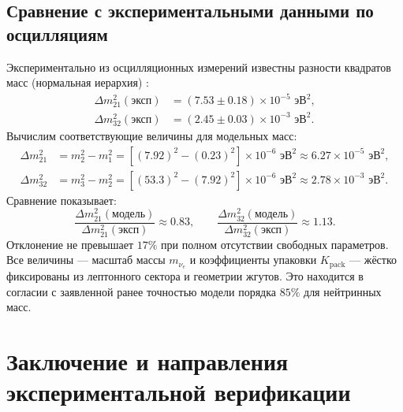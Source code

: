 \documentclass[12pt,a4paper]{article}
\begin{document}
\subsection{Сравнение с экспериментальными данными по осцилляциям}
Экспериментально из осцилляционных измерений известны разности квадратов масс (нормальная иерархия) \cite{pdg2024}:
\begin{align}
\Delta m^2_{21}(\text{эксп}) &= (7.53 \pm 0.18) \times 10^{-5} \text{ эВ}^2, \\
\Delta m^2_{32}(\text{эксп}) &= (2.45 \pm 0.03) \times 10^{-3} \text{ эВ}^2.
\end{align}
Вычислим соответствующие величины для модельных масс:
\begin{align}
\Delta m^2_{21} &= m_2^2 - m_1^2 = [(7.92)^2 - (0.23)^2] \times 10^{-6} \text{ эВ}^2 \approx 6.27 \times 10^{-5} \text{ эВ}^2, \\
\Delta m^2_{32} &= m_3^2 - m_2^2 = [(53.3)^2 - (7.92)^2] \times 10^{-6} \text{ эВ}^2 \approx 2.78 \times 10^{-3} \text{ эВ}^2.
\end{align}
Сравнение показывает:
\begin{equation}
\frac{\Delta m^2_{21}(\text{модель})}{\Delta m^2_{21}(\text{эксп})} \approx 0.83, \qquad
\frac{\Delta m^2_{32}(\text{модель})}{\Delta m^2_{32}(\text{эксп})} \approx 1.13.
\end{equation}
Отклонение не превышает $17\%$ при полном отсутствии свободных параметров. Все величины — масштаб массы $m_{\nu_e}$ и коэффициенты упаковки $K_{\text{pack}}$ — жёстко фиксированы из лептонного сектора и геометрии жгутов. Это находится в согласии с заявленной ранее точностью модели порядка $85\%$ для нейтринных масс.

\section{Заключение и направления экспериментальной верификации}
\end{document}
